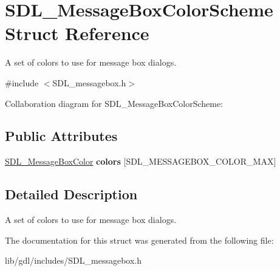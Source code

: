 \hypertarget{struct_s_d_l___message_box_color_scheme}{}\section{S\+D\+L\+\_\+\+Message\+Box\+Color\+Scheme Struct Reference}
\label{struct_s_d_l___message_box_color_scheme}


A set of colors to use for message box dialogs.  




{\ttfamily \#include $<$S\+D\+L\+\_\+messagebox.\+h$>$}



Collaboration diagram for S\+D\+L\+\_\+\+Message\+Box\+Color\+Scheme\+:
\subsection*{Public Attributes}
\begin{DoxyCompactItemize}
\item 
\hypertarget{struct_s_d_l___message_box_color_scheme_ae3712ec81e41b63b781b7d49d3b3b8f6}{}\hyperlink{struct_s_d_l___message_box_color}{S\+D\+L\+\_\+\+Message\+Box\+Color} {\bfseries colors} \mbox{[}S\+D\+L\+\_\+\+M\+E\+S\+S\+A\+G\+E\+B\+O\+X\+\_\+\+C\+O\+L\+O\+R\+\_\+\+M\+A\+X\mbox{]}\label{struct_s_d_l___message_box_color_scheme_ae3712ec81e41b63b781b7d49d3b3b8f6}

\end{DoxyCompactItemize}


\subsection{Detailed Description}
A set of colors to use for message box dialogs. 

The documentation for this struct was generated from the following file\+:\begin{DoxyCompactItemize}
\item 
lib/gdl/includes/S\+D\+L\+\_\+messagebox.\+h\end{DoxyCompactItemize}
